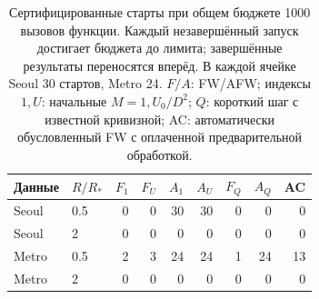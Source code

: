 \begin{table}[htbp]
\centering\small
\caption{Сертифицированные старты при общем бюджете 1000 вызовов функции. Каждый незавершённый запуск достигает бюджета до лимита; завершённые результаты переносятся вперёд. В каждой ячейке Seoul 30 стартов, Metro 24. $F/A$: FW/AFW; индексы $1,U$: начальные $M=1,U_0/D^2$; $Q$: короткий шаг с известной кривизной; AC: автоматически обусловленный FW с оплаченной предварительной обработкой.}
\label{tab:budget}
\begin{tabular}{llrrrrrrr}
\toprule
Данные & $R/R_*$ & $F_1$ & $F_U$ & $A_1$ & $A_U$ & $F_Q$ & $A_Q$ & AC \\
\midrule
Seoul & 0.5 & 0 & 0 & 30 & 30 & 0 & 0 & 0 \\
Seoul & 2 & 0 & 0 & 0 & 0 & 0 & 0 & 0 \\
Metro & 0.5 & 2 & 3 & 24 & 24 & 1 & 24 & 13 \\
Metro & 2 & 0 & 0 & 0 & 0 & 0 & 0 & 0 \\
\bottomrule
\end{tabular}
\end{table}
